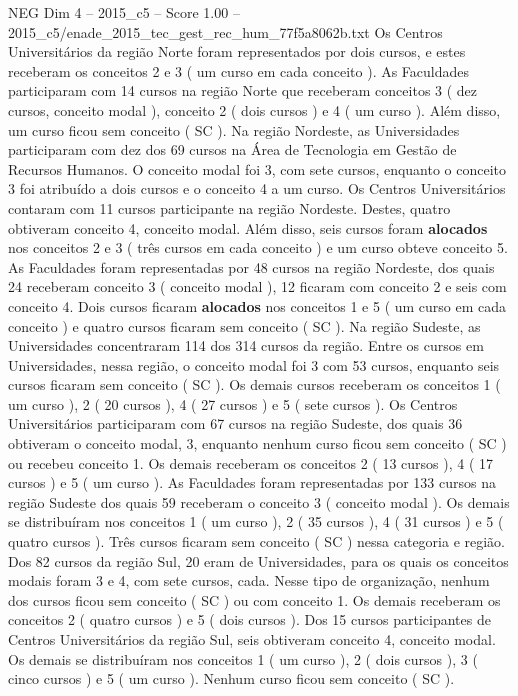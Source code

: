 \begin{textsample}{NEG Dim 4 – 2015\_c5 – Score 1.00 – 2015\_c5/enade\_2015\_tec\_gest\_rec\_hum\_77f5a8062b.txt}
Os Centros Universitários da região Norte foram representados por dois cursos, e estes receberam os conceitos 2 e 3 ( um curso em cada conceito ).
As Faculdades participaram com 14 cursos na região Norte que receberam conceitos 3 ( dez cursos, conceito modal ), conceito 2 ( dois cursos ) e 4 ( um curso ).
Além disso, um curso ficou sem conceito ( SC ).
Na região Nordeste, as Universidades participaram com dez dos 69 cursos na Área de Tecnologia em Gestão de Recursos Humanos.
O conceito modal foi 3, com sete cursos, enquanto o conceito 3 foi atribuído a dois cursos e o conceito 4 a um curso.
Os Centros Universitários contaram com 11 cursos participante na região Nordeste.
Destes, quatro obtiveram conceito 4, conceito modal.
Além disso, seis cursos foram \textbf{alocados} nos conceitos 2 e 3 ( três cursos em cada conceito ) e um curso obteve conceito 5.
As Faculdades foram representadas por 48 cursos na região Nordeste, dos quais 24 receberam conceito 3 ( conceito modal ), 12 ficaram com conceito 2 e seis com conceito 4.
Dois cursos ficaram \textbf{alocados} nos conceitos 1 e 5 ( um curso em cada conceito ) e quatro cursos ficaram sem conceito ( SC ).
Na região Sudeste, as Universidades concentraram 114 dos 314 cursos da região.
Entre os cursos em Universidades, nessa região, o conceito modal foi 3 com 53 cursos, enquanto seis cursos ficaram sem conceito ( SC ).
Os demais cursos receberam os conceitos 1 ( um curso ), 2 ( 20 cursos ), 4 ( 27 cursos ) e 5 ( sete cursos ).
Os Centros Universitários participaram com 67 cursos na região Sudeste, dos quais 36 obtiveram o conceito modal, 3, enquanto nenhum curso ficou sem conceito ( SC ) ou recebeu conceito 1.
Os demais receberam os conceitos 2 ( 13 cursos ), 4 ( 17 cursos ) e 5 ( um curso ).
As Faculdades foram representadas por 133 cursos na região Sudeste dos quais 59 receberam o conceito 3 ( conceito modal ).
Os demais se distribuíram nos conceitos 1 ( um curso ), 2 ( 35 cursos ), 4 ( 31 cursos ) e 5 ( quatro cursos ).
Três cursos ficaram sem conceito ( SC ) nessa categoria e região.
Dos 82 cursos da região Sul, 20 eram de Universidades, para os quais os conceitos modais foram 3 e 4, com sete cursos, cada.
Nesse tipo de organização, nenhum dos cursos ficou sem conceito ( SC ) ou com conceito 1.
Os demais receberam os conceitos 2 ( quatro cursos ) e 5 ( dois cursos ).
Dos 15 cursos participantes de Centros Universitários da região Sul, seis obtiveram conceito 4, conceito modal.
Os demais se distribuíram nos conceitos 1 ( um curso ), 2 ( dois cursos ), 3 ( cinco cursos ) e 5 ( um curso ).
Nenhum curso ficou sem conceito ( SC ).

\end{textsample}
